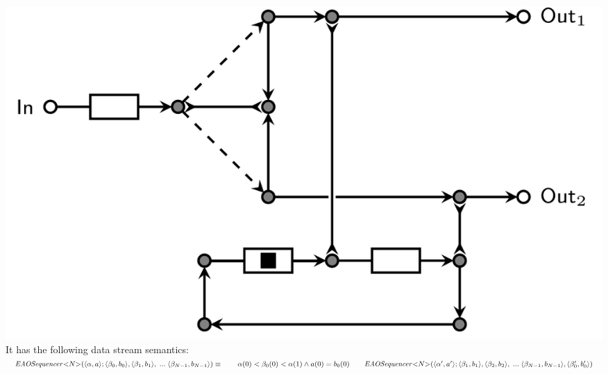 \includegraphics[]{img/EAOSeq.png}\\
%
It has the following data stream semantics:\\
%
$
\vspace{0.2cm}\mathit{EAOSequencer}{<}N{>}(\langle \alpha, a \rangle;\langle \beta_0, b_0 \rangle, \langle \beta_1, b_1 \rangle,\;...\; \langle \beta_{N-1}, b_{N-1} \rangle) \equiv \\
\vspace{0.2cm} \hphantom \qquad \alpha(0) < \beta_0(0) < \alpha(1) \land a(0) = b_0(0) \\
\vspace{0.2cm} \hphantom \qquad \mathit{EAOSequencer}{<}N{>}(\langle \alpha', a' \rangle; \langle \beta_1, b_1 \rangle,\langle \beta_2, b_2 \rangle,\;...\; \langle \beta_{N-1}, b_{N-1} \rangle, \langle \beta_0', b_0' \rangle)
$

